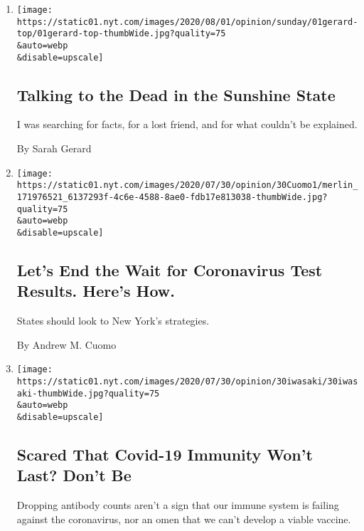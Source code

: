 \begin{enumerate}
\def\labelenumi{\arabic{enumi}.}
\item
  \href{/2020/08/01/opinion/spiritualism-cassadaga-florida.html}{}

  \texttt{[image: https://static01.nyt.com/images/2020/08/01/opinion/sunday/01gerard-top/01gerard-top-thumbWide.jpg?quality=75\\\&auto=webp\\\&disable=upscale]}

  \hypertarget{talking-to-the-dead-in-the-sunshine-state}{%
  \subsection{Talking to the Dead in the Sunshine
  State}\label{talking-to-the-dead-in-the-sunshine-state}}

  I was searching for facts, for a lost friend, and for what couldn't be
  explained.

  By Sarah Gerard
\item
  \href{/2020/07/31/opinion/coronavirus-testing-cuomo.html}{}

  \texttt{[image: https://static01.nyt.com/images/2020/07/30/opinion/30Cuomo1/merlin\_171976521\_6137293f-4c6e-4588-8ae0-fdb17e813038-thumbWide.jpg?quality=75\\\&auto=webp\\\&disable=upscale]}

  \hypertarget{lets-end-the-wait-for-coronavirus-test-results-heres-how}{%
  \subsection{Let's End the Wait for Coronavirus Test Results. Here's
  How.}\label{lets-end-the-wait-for-coronavirus-test-results-heres-how}}

  States should look to New York's strategies.

  By Andrew M. Cuomo
\item
  \href{/2020/07/31/opinion/coronavirus-antibodies-immunity.html}{}

  \texttt{[image: https://static01.nyt.com/images/2020/07/30/opinion/30iwasaki/30iwasaki-thumbWide.jpg?quality=75\\\&auto=webp\\\&disable=upscale]}

  \hypertarget{scared-that-covid-19-immunity-wont-last-dont-be}{%
  \subsection{Scared That Covid-19 Immunity Won't Last? Don't
  Be}\label{scared-that-covid-19-immunity-wont-last-dont-be}}

  Dropping antibody counts aren't a sign that our immune system is
  failing against the coronavirus, nor an omen that we can't develop a
  viable vaccine.


\end{enumerate}
